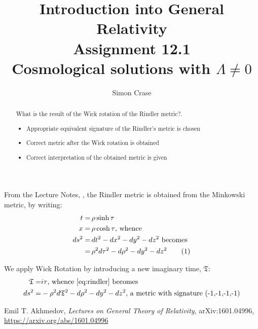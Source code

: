 \documentclass[]{article}
\title{Introduction into General Relativity\\Assignment 12.1\\Cosmological solutions with $\Lambda\ne 0$}
\author{Simon Crase}
\newcommand\numberthis{\addtocounter{equation}{1}\tag{\theequation}}
\begin{document}
\maketitle

\begin{abstract}
What is the result of the Wick rotation of the Rindler metric?.
\begin{itemize}
	\item  Appropriate equivalent signature of the Rindler's metric is chosen
	\item  Correct metric after the Wick rotation is obtained
	\item  Correct interpretation of the obtained metric is given
\end{itemize}
\end{abstract}


From the Lecture Notes, \cite[I, (9) \& (10)]{Akhmedov2017}, the Rindler metric is obtained from the Minkowski metric, by writing:
\begin{align*}
t=&\, \rho \sinh \tau \\
x=&\, \rho \cosh \tau \text{, whence}\\
ds^2 =&\, dt^2-dx^2-dy^2-dz^2\text{ becomes}\\
=&\, \rho^2 d\tau^2 - d\rho ^2 -dy^2-dz^2\numberthis\label{eq:rindler}
\end{align*}

We apply Wick Rotation by introducing a new imaginary time, $\mathfrak{T}$:
\begin{align*}
\mathfrak{T}=&i\tau\text{, whence \eqref{eq:rindler} becomes}\\
ds^2 =& -\rho^2 d\mathfrak{T}^2 - d\rho^2-dy^2-dz^2\text{, a metric with signature (-1,-1,-1,-1)}
\end{align*}


\begin{thebibliography}{9}\label{section:biblio}
	\raggedright
	Emil T. Akhmedov,
	\emph{Lectures on General Theory of Relativity},
	arXiv:1601.04996,
	\url{https://arxiv.org/abs/1601.04996}
\end{thebibliography}
\end{document}
